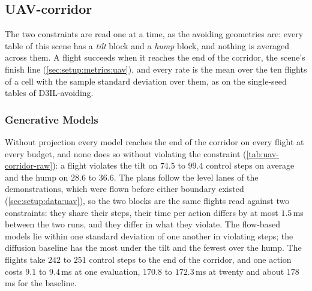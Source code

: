 \subsection{UAV-corridor}\label{sec:res:uav:corridor}

The two constraints are read one at a time, as the avoiding geometries are: every table of this scene has a
\emph{tilt} block and a \emph{hump} block, and nothing is averaged across them. A flight succeeds when it
reaches the end of the corridor, the scene's finish line (\autoref{sec:setup:metrics:uav}), and every rate
is the mean over the ten flights of a cell with the sample standard deviation over them, as on the
single-seed tables of D3IL-avoiding.

\subsubsection{Generative Models}\label{sec:res:uav:corridor:raw}
Without projection every model reaches the end of the corridor on every flight at every budget, and none
does so without violating the constraint (\autoref{tab:uav-corridor-raw}): a flight violates the tilt on
$74.5$ to $99.4$ control steps on average and the hump on $28.6$ to $36.6$. The plans follow the level
lanes of the demonstrations, which were flown before either boundary existed
(\autoref{sec:setup:data:uav}), so the two blocks are the same flights read against two constraints: they
share their steps, their time per action differs by at most $1.5$\,ms between the two runs, and they differ
in what they violate. The flow-based models lie within
one standard deviation of one another in violating steps; the diffusion baseline has the most under the
tilt and the fewest over the hump. The flights take $242$ to $251$ control steps to the end of the
corridor, and one action costs $9.1$ to $9.4$\,ms at one evaluation, $170.8$ to $172.3$\,ms at twenty and
about $178$\,ms for the baseline.

